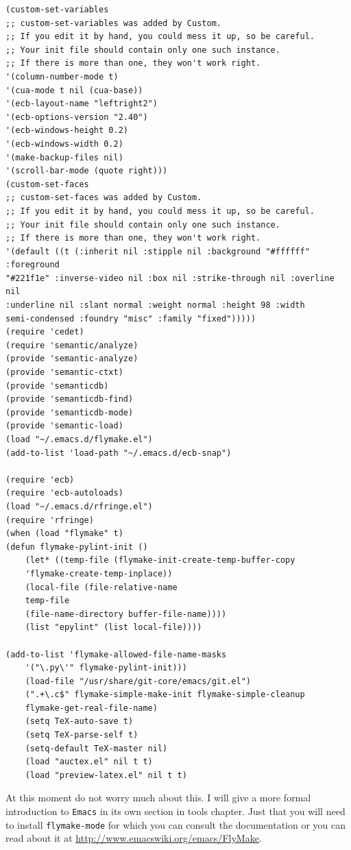 \begin{verbatim}
(custom-set-variables
;; custom-set-variables was added by Custom.
;; If you edit it by hand, you could mess it up, so be careful.
;; Your init file should contain only one such instance.
;; If there is more than one, they won't work right.
'(column-number-mode t)
'(cua-mode t nil (cua-base))
'(ecb-layout-name "leftright2")
'(ecb-options-version "2.40")
'(ecb-windows-height 0.2)
'(ecb-windows-width 0.2)
'(make-backup-files nil)
'(scroll-bar-mode (quote right)))
(custom-set-faces
;; custom-set-faces was added by Custom.
;; If you edit it by hand, you could mess it up, so be careful.
;; Your init file should contain only one such instance.
;; If there is more than one, they won't work right.
'(default ((t (:inherit nil :stipple nil :background "#ffffff" :foreground
"#221f1e" :inverse-video nil :box nil :strike-through nil :overline nil
:underline nil :slant normal :weight normal :height 98 :width
semi-condensed :foundry "misc" :family "fixed")))))
(require 'cedet)
(require 'semantic/analyze)
(provide 'semantic-analyze)
(provide 'semantic-ctxt)
(provide 'semanticdb)
(provide 'semanticdb-find)
(provide 'semanticdb-mode)
(provide 'semantic-load)
(load "~/.emacs.d/flymake.el")
(add-to-list 'load-path "~/.emacs.d/ecb-snap")

(require 'ecb)
(require 'ecb-autoloads)
(load "~/.emacs.d/rfringe.el")
(require 'rfringe)
(when (load "flymake" t)
(defun flymake-pylint-init ()
    (let* ((temp-file (flymake-init-create-temp-buffer-copy
    'flymake-create-temp-inplace))
    (local-file (file-relative-name
    temp-file
    (file-name-directory buffer-file-name))))
    (list "epylint" (list local-file))))

(add-to-list 'flymake-allowed-file-name-masks
    '("\.py\'" flymake-pylint-init)))
    (load-file "/usr/share/git-core/emacs/git.el")
    (".+\.c$" flymake-simple-make-init flymake-simple-cleanup
    flymake-get-real-file-name)
    (setq TeX-auto-save t)
    (setq TeX-parse-self t)
    (setq-default TeX-master nil)
    (load "auctex.el" nil t t)
    (load "preview-latex.el" nil t t)
\end{verbatim}

At this moment do not worry much about this. I will give a more formal
introduction to \texttt{Emacs} in its own section in tools chapter.
Just that you will need to install \texttt{flymake-mode} for which you can
consult the documentation or you can read about it at
\url{http://www.emacswiki.org/emacs/FlyMake}.

